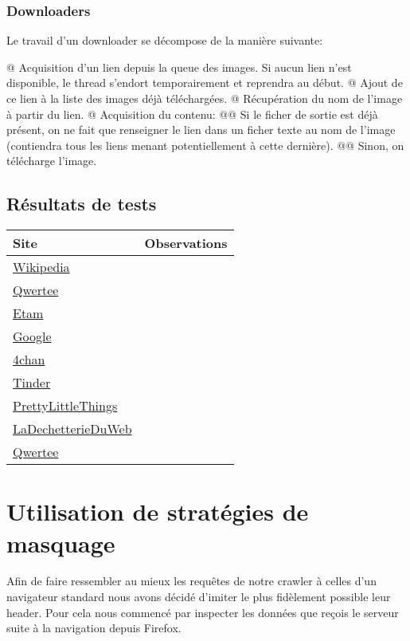 \documentclass[hideweeklyreports,noposter]{polytech/polytech}
\begin{document}
			\subsection{Downloaders}
				Le travail d'un downloader se décompose de la manière suivante:
				\begin{easylist}
					@ Acquisition d'un lien depuis la queue des images.
					Si aucun lien n'est disponible, le thread s'endort temporairement et reprendra au début.
					@ Ajout de ce lien à la liste des images déjà téléchargées.
					@ Récupération du nom de l'image à partir du lien.
					@ Acquisition du contenu:
					@@ Si le ficher de sortie est déjà présent, on ne fait que renseigner le lien dans un ficher texte au nom de l'image (contiendra tous les liens menant potentiellement à cette dernière).
					@@ Sinon, on télécharge l'image.
				\end{easylist}
				
		\section{Résultats de tests}
			\begin{center}
				\centering
				\begin{tabularx}{\textwidth}{|X|X|}
					\hline
					Site & Observations\\\hline
					\href{https://en.wikipedia.org/wiki/Main_Page}{Wikipedia} & \\\hline
					\href{https://www.qwertee.com/}{Qwertee} & \\\hline
					\href{https://www.etam.com/}{Etam} & \\\hline
					\href{https://www.google.com/}{Google} & \\\hline
					\href{https://www.4chan.org/}{4chan} & \\\hline
					\href{https://tinder.com/}{Tinder} & \\\hline
					\href{https://www.prettylittlethings.fr/}{PrettyLittleThings} & \\\hline
					\href{https://www.ladechetterieduweb.com/}{LaDechetterieDuWeb} & \\\hline
					\href{https://www.qwertee.com/}{Qwertee} & \\\hline
				\end{tabularx}
			\end{center}
	
	\chapter{Utilisation de stratégies de masquage}
		Afin de faire ressembler au mieux les requêtes de notre crawler à celles d'un navigateur standard nous avons décidé d'imiter le plus fidèlement possible leur header.
		Pour cela nous commencé par inspecter les données que reçois le serveur suite à la navigation depuis Firefox.
		
\end{document}
